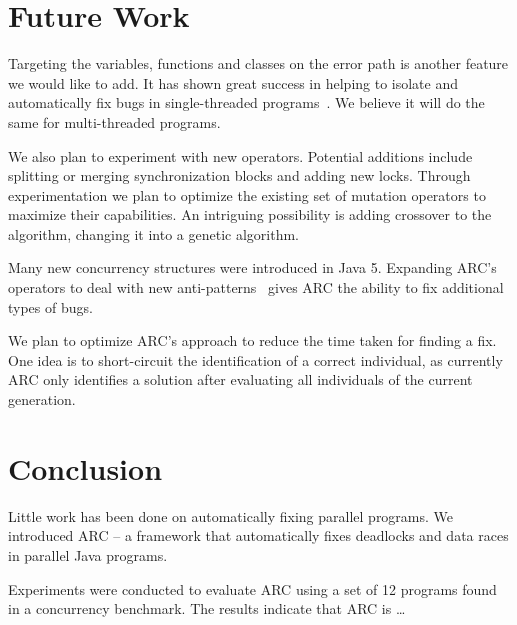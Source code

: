 \documentclass{llncs}
\begin{document}

\section{Future Work}
\label{sec:future_work}

Targeting the variables, functions and classes on the error path is another
feature we would like to add. It has shown great success in helping to isolate
and automatically fix bugs in single-threaded programs~\cite{FNWG09, NWLF09,
WFGN10, GNFW11}. We believe it will do the same for multi-threaded programs.

We also plan to experiment with new operators. Potential additions include
splitting or merging synchronization blocks and adding new locks. Through
experimentation we plan to optimize the existing set of mutation operators to
maximize their capabilities.  An intriguing possibility is adding crossover to
the algorithm, changing it into a genetic algorithm.

Many new concurrency structures were introduced in Java 5. Expanding ARC's
operators to deal with new anti-patterns~\cite{BJ09, FKLV12, BCD06} gives ARC
the ability to fix additional types of bugs.

We plan to optimize ARC's approach to reduce the time taken for finding a fix.
One idea is to short-circuit the identification of a correct individual, as
currently ARC only identifies a solution after evaluating all individuals of
the current generation.

\section{Conclusion}
\label{sec:conclusion}

Little work has been done on automatically fixing parallel programs. We
introduced ARC -- a framework that automatically fixes deadlocks and data races
in parallel Java programs.

Experiments were conducted to evaluate ARC using a set of 12 programs found in
a concurrency benchmark. The results indicate that ARC is \ldots %



\end{document}

